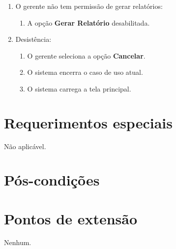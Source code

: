 \begin{enumerate}
	\item O gerente não tem permissão de gerar relatórios:
	\begin{enumerate}
		\item A opção \textbf{Gerar Relatório} desabilitada.
	\end{enumerate}	
	\item Desistência:
	\begin{enumerate}
		\item O gerente seleciona a opção \textbf{Cancelar}.
		\item O sistema encerra o caso de uso atual.
		\item O sistema carrega a tela principal.
	\end{enumerate}
\end{enumerate}

\section{Requerimentos especiais}

Não aplicável.

\section{Pós-condições}

\section{Pontos de extensão}

Nenhum.